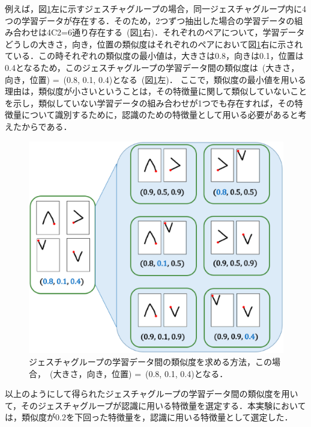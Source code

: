 例えば，図\ref{fig:group_similarity}左に示すジェスチャグループの場合，同一ジェスチャグループ内に4つの学習データが存在する．そのため，2つずつ抽出した場合の学習データの組み合わせは{\scriptsize 4}C{\scriptsize 2}=6通り存在する~(図\ref{fig:group_similarity}右)．それぞれのペアについて，学習データどうしの大きさ，向き，位置の類似度はそれぞれのペアにおいて図\ref{fig:group_similarity}右に示されている．この時それぞれの類似度の最小値は，大きさは0.8，向きは0.1，位置は0.4となるため，このジェスチャグループの学習データ間の類似度は~(大きさ，向き，位置) =~(0.8, 0.1, 0.4)となる~(図\ref{fig:group_similarity}左)．
ここで，類似度の最小値を用いる理由は，類似度が小さいということは，その特徴量に関して類似していないことを示し，類似していない学習データの組み合わせが1つでも存在すれば，その特徴量について識別するために，認識のための特徴量として用いる必要があると考えたからである．

\begin{figure} [h!]
	\begin{center}
		\includegraphics [width=0.8\hsize ]{img/group_similarity.eps}
	\end{center}
	\caption{ジェスチャグループの学習データ間の類似度を求める方法，この場合，~(大きさ，向き，位置) =~(0.8, 0.1, 0.4)となる．}
	\label{fig:group_similarity}
\end{figure}

以上のようにして得られたジェスチャグループの学習データ間の類似度を用いて，そのジェスチャグループが認識に用いる特徴量を選定する．本実験においては，類似度が0.2を下回った特徴量を，認識に用いる特徴量として選定した．


